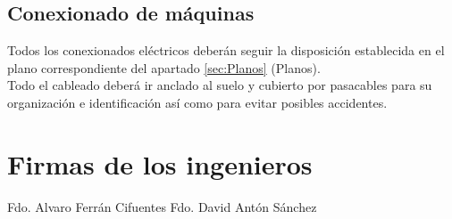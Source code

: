 \subsection{Conexionado de máquinas}
Todos los conexionados eléctricos deberán seguir la disposición establecida en el plano correspondiente del apartado \ref{sec:Planos} (Planos).  \\
Todo el cableado deberá ir anclado al suelo y cubierto por pasacables para su organización e identificación así como para evitar posibles accidentes.


\newpage\section {Firmas de los ingenieros}
\vspace{5cm}
Fdo. Alvaro Ferrán Cifuentes
\vspace{5cm}\hspace{5cm}
Fdo. David Antón Sánchez
